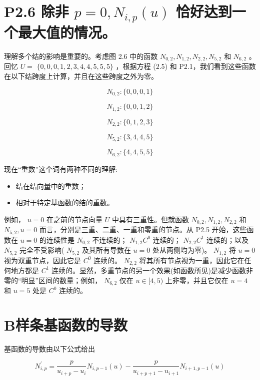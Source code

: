 \documentclass[../main.tex]{subfiles}
\begin{document}
\section*{P2.6 除非 \(p = 0,{N}_{i,p}\left( u\right)\) 恰好达到一个最大值的情况。}

理解多个结的影响是重要的。考虑图 2.6 中的函数 \({N}_{0,2},{N}_{1,2},{N}_{2,2},{N}_{5,2}\) 和 \({N}_{6,2}\) 。回忆 \(U =\)  \(\{ 0,0,0,1,2,3,4,4,5,5,5\}\) ，根据方程 (2.5) 和 P2.1，我们看到这些函数在以下结跨度上计算，并且在这些跨度之外为零。

\[
{N}_{0,2} : \{ 0,0,0,1\}
\]

\[
{N}_{1,2} : \{ 0,0,1,2\}
\]

\[
{N}_{2,2} : \{ 0,1,2,3\}
\]

\[
{N}_{5,2} : \{ 3,4,4,5\}
\]

\[
{N}_{6,2} : \{ 4,4,5,5\}
\]

现在“重数”这个词有两种不同的理解:

\begin{itemize}
\item 结在结向量中的重数；
\end{itemize}

\begin{itemize}
\item 相对于特定基函数的结的重数。
\end{itemize}

例如， \(u = 0\) 在之前的节点向量 \(U\) 中具有三重性。但就函数 \({N}_{0,2},{N}_{1,2},{N}_{2,2}\) 和 \({N}_{5,2},u = 0\) 而言，分别是三重、二重、一重和零重的节点。从 P2.5 开始，这些函数在 \(u = 0\) 的连续性是 \({N}_{0,2}\) 不连续的； \({N}_{1,2}{C}^{0}\) 连续的； \({N}_{2,2}{C}^{1}\) 连续的；以及 \({N}_{5,2}\) 完全不受影响( \({N}_{5,2}\) 及其所有导数在 \(u = 0\) 处从两侧均为零)。 \({N}_{1,2}\) 将 \(u = 0\) 视为双重节点，因此它是 \({C}^{0}\) 连续的。 \({N}_{2,2}\) 将其所有节点视为一重，因此它在任何地方都是 \({C}^{1}\) 连续的。显然，多重节点的另一个效果(如函数所见)是减少函数非零的“明显”区间的数量；例如， \({N}_{6,2}\) 仅在 \(u \in  \lbrack 4,5)\) 上非零，并且它仅在 \(u = 4\) 和 \(u = 5\) 处是 \({C}^{0}\) 连续的。


\section{B样条基函数的导数}

基函数的导数由以下公式给出

\[
{N}_{i,p}^{\prime } = \frac{p}{{u}_{i + p} - {u}_{i}}{N}_{i,p - 1}\left( u\right)  - \frac{p}{{u}_{i + p + 1} - {u}_{i + 1}}{N}_{i + 1,p - 1}\left( u\right)  \tag{2.7}
\]
\end{document}

